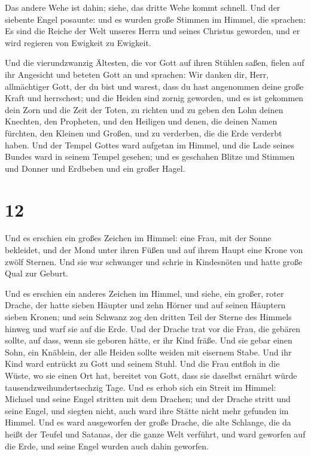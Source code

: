  Das andere Wehe ist dahin; siehe, das dritte Wehe kommt
schnell.  Und der siebente Engel posaunte: und es wurden
große Stimmen im Himmel, die sprachen: Es sind die Reiche der Welt
unseres Herrn und seines Christus geworden, und er wird regieren von
Ewigkeit zu Ewigkeit.

 Und die vierundzwanzig Ältesten, die vor Gott auf ihren
Stühlen saßen, fielen auf ihr Angesicht und beteten Gott an
 und sprachen: Wir danken dir, Herr, allmächtiger Gott,
der du bist und warest, dass du hast angenommen deine große Kraft und
herrschest;  und die Heiden sind zornig geworden, und es
ist gekommen dein Zorn und die Zeit der Toten, zu richten und zu geben
den Lohn deinen Knechten, den Propheten, und den Heiligen und denen, die
deinen Namen fürchten, den Kleinen und Großen, und zu verderben, die die
Erde verderbt haben.  Und der Tempel Gottes ward aufgetan
im Himmel, und die Lade seines Bundes ward in seinem Tempel gesehen; und
es geschahen Blitze und Stimmen und Donner und Erdbeben und ein großer
Hagel.

\hypertarget{section-11}{%
\section{12}\label{section-11}}

 Und es erschien ein großes Zeichen im Himmel: eine Frau,
mit der Sonne bekleidet, und der Mond unter ihren Füßen und auf ihrem
Haupt eine Krone von zwölf Sternen.  Und sie war schwanger
und schrie in Kindesnöten und hatte große Qual zur Geburt.

 Und es erschien ein anderes Zeichen im Himmel, und siehe,
ein großer, roter Drache, der hatte sieben Häupter und zehn Hörner und
auf seinen Häuptern sieben Kronen;  und sein Schwanz zog
den dritten Teil der Sterne des Himmels hinweg und warf sie auf die
Erde. Und der Drache trat vor die Frau, die gebären sollte, auf dass,
wenn sie geboren hätte, er ihr Kind fräße.  Und sie gebar
einen Sohn, ein Knäblein, der alle Heiden sollte weiden mit eisernem
Stabe. Und ihr Kind ward entrückt zu Gott und seinem Stuhl.
 Und die Frau entfloh in die Wüste, wo sie einen Ort hat,
bereitet von Gott, dass sie daselbst ernährt würde
tausendzweihundertsechzig Tage.  Und es erhob sich ein
Streit im Himmel: Michael und seine Engel stritten mit dem Drachen; und
der Drache stritt und seine Engel,  und siegten nicht,
auch ward ihre Stätte nicht mehr gefunden im Himmel.  Und
es ward ausgeworfen der große Drache, die alte Schlange, die da heißt
der Teufel und Satanas, der die ganze Welt verführt, und ward geworfen
auf die Erde, und seine Engel wurden auch dahin geworfen.

